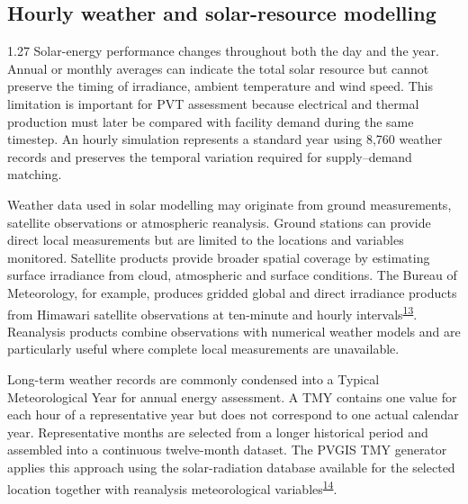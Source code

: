 \documentclass[12pt,letterpaper]{article}
\newcommand{\done}{\ \textcolor{green!45!black}{$\checkmark$}} %
\DeclareRobustCommand{\citenum}[1]{\hyperlink{ref:#1}{#1}} %
\begin{document}
\subsection[Hourly weather and solar-resource modelling\done]{Hourly weather and solar-resource modelling}\label{sec10}

\begin{spacing}{1.27}
Solar-energy performance changes throughout both the day and the year. Annual or monthly averages can indicate the total solar resource but cannot preserve the timing of irradiance, ambient temperature and wind speed. This limitation is important for PVT assessment because electrical and thermal production must later be compared with facility demand during the same timestep. An hourly simulation represents a standard year using 8,760 weather records and preserves the temporal variation required for supply--demand matching.\par

\vspace{0.15in}

Weather data used in solar modelling may originate from ground measurements, satellite observations or atmospheric reanalysis. Ground stations can provide direct local measurements but are limited to the locations and variables monitored. Satellite products provide broader spatial coverage by estimating surface irradiance from cloud, atmospheric and surface conditions. The Bureau of Meteorology, for example, produces gridded global and direct irradiance products from Himawari satellite observations at ten-minute and hourly intervals\textsuperscript{\citenum{13}}. Reanalysis products combine observations with numerical weather models and are particularly useful where complete local measurements are unavailable.\par

\vspace{0.15in}

Long-term weather records are commonly condensed into a Typical Meteorological Year for annual energy assessment. A TMY contains one value for each hour of a representative year but does not correspond to one actual calendar year. Representative months are selected from a longer historical period and assembled into a continuous twelve-month dataset. The PVGIS TMY generator applies this approach using the solar-radiation database available for the selected location together with reanalysis meteorological variables\textsuperscript{\citenum{14}}.\par


\end{spacing}
\end{document}
